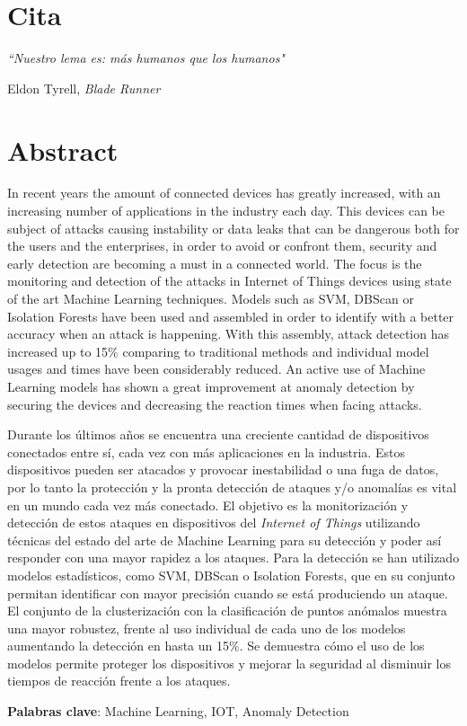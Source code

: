 \chapter*{Cita}

\setlength{}
\setlength\epigraphrule{0pt}

\epigraph{\itshape``Nuestro lema es: más humanos que los humanos"}{Eldon Tyrell, \textit{Blade Runner}}


\chapter*{Abstract}

\onehalfspacing

In recent years the amount of connected devices has greatly increased, with an increasing number of applications in the industry each day. This devices can be subject of attacks causing instability or data leaks that can be dangerous both for the users and the enterprises, in order to avoid or confront them, security and early detection are becoming a must in a connected world. The focus is the monitoring and detection of the attacks in Internet of Things devices using state of the art Machine Learning techniques. Models such as SVM, DBScan or Isolation Forests have been used and assembled in order to identify with a better accuracy when an attack is happening. With this assembly, attack detection has increased up to 15\% comparing to traditional methods and individual model usages and times have been considerably reduced. An active use of Machine Learning models has shown a great improvement at anomaly detection by securing the devices and decreasing the reaction times when facing attacks.

\vspace{0.5cm}

Durante los últimos años se encuentra una creciente cantidad de dispositivos conectados entre sí, cada vez con más aplicaciones en la industria. Estos dispositivos pueden ser atacados y provocar inestabilidad o una fuga de datos, por lo tanto la protección y la pronta detección de ataques y/o anomalías es vital en un mundo cada vez más conectado. El objetivo es la monitorización y detección de estos ataques en dispositivos del \textit{Internet of Things} utilizando técnicas del estado del arte de Machine Learning para su detección y poder así responder con una mayor rapidez a los ataques. Para la detección se han utilizado modelos estadísticos, como SVM, DBScan o Isolation Forests, que en su conjunto permitan identificar con mayor precisión cuando se está produciendo un ataque. El conjunto de la clusterización con la clasificación de puntos anómalos muestra una mayor robustez, frente al uso individual de cada uno de los modelos aumentando la detección en hasta un 15\%. Se demuestra cómo el uso de los modelos permite proteger los dispositivos y mejorar la seguridad al disminuir los tiempos de reacción frente a los ataques.

\vspace{0.5cm}
\textbf{Palabras clave}: Machine Learning, IOT, Anomaly Detection